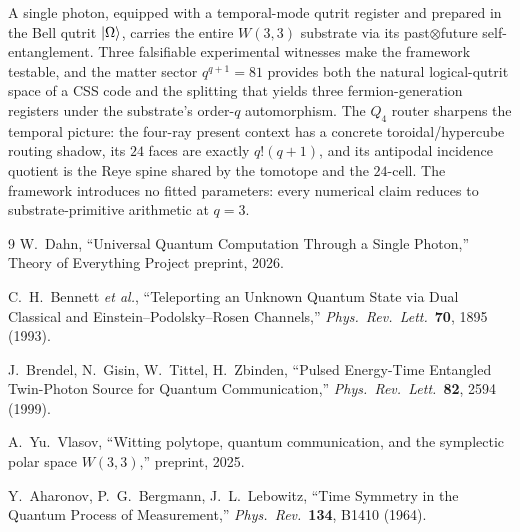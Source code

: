 \documentclass[11pt]{article}
\begin{document}
A single photon, equipped with a temporal-mode qutrit register and
prepared in the Bell qutrit $\ket{\Omega}$, carries the entire $W(3,3)$
substrate via its past$\otimes$future self-entanglement.  Three falsifiable
experimental witnesses make the framework testable, and the matter sector
$q^{q+1} = 81$ provides both the natural logical-qutrit space of a CSS
code and the splitting that yields three fermion-generation registers
under the substrate's order-$q$ automorphism.  The $Q_4$ router sharpens
the temporal picture: the four-ray present context has a concrete
toroidal/hypercube routing shadow, its $24$ faces are exactly
$q!(q+1)$, and its antipodal incidence quotient is the Reye spine shared
by the tomotope and the $24$-cell.  The framework introduces no fitted
parameters: every numerical claim reduces to substrate-primitive
arithmetic at $q = 3$.

\begin{thebibliography}{9}
  W.~Dahn, ``Universal Quantum Computation Through a Single Photon,''
  Theory of Everything Project preprint, 2026.

  C.~H.~Bennett \emph{et al.},
  ``Teleporting an Unknown Quantum State via Dual Classical and
  Einstein--Podolsky--Rosen Channels,''
  \emph{Phys.~Rev.~Lett.}~\textbf{70}, 1895 (1993).

  J.~Brendel, N.~Gisin, W.~Tittel, H.~Zbinden,
  ``Pulsed Energy-Time Entangled Twin-Photon Source for Quantum
  Communication,''
  \emph{Phys.~Rev.~Lett.}~\textbf{82}, 2594 (1999).

  A.~Yu.~Vlasov, ``Witting polytope, quantum communication, and the
  symplectic polar space $W(3,3)$,'' preprint, 2025.

  Y.~Aharonov, P.~G.~Bergmann, J.~L.~Lebowitz,
  ``Time Symmetry in the Quantum Process of Measurement,''
  \emph{Phys.~Rev.}~\textbf{134}, B1410 (1964).
\end{thebibliography}
\end{document}
